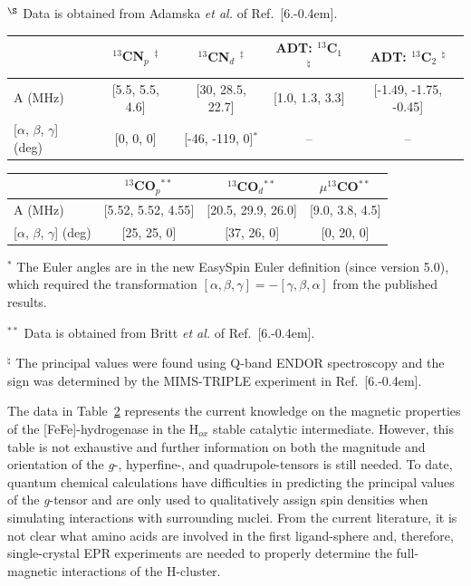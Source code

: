 \begin{table}[hb]
\begin{flushleft}
{$^{\S}$ Data is obtained from Adamska \textit{et al.} of Ref.~[6.\kern-0.4em]. }\end{flushleft}

\begin{tabular}{l|c|c|c|c}
 & $^{13}$CN$_p$ $^\ddagger$ & $^{13}$CN$_d$ $^\ddagger$ & ADT: $^{13}$C$_1$ $^\natural$ & ADT: $^{13}$C$_2$ $^\natural$ \\ \hline \hline
A (MHz) & {[}5.5, 5.5, 4.6{]} & {[}30, 28.5, 22.7{]} & {[}1.0, 1.3, 3.3{]} & {[}-1.49, -1.75, -0.45{]} \\
{[}$\alpha$, $\beta$, $\gamma${]} (deg) & {[}0, 0, 0{]} & {[}-46, -119, 0{]}$^\ast$ & -- & -- \\
\end{tabular}
\newline
\vspace*{0.5em}
\newline
\begin{tabular}{l|c|c|c}
 & $^{13}$CO$_p$$^{\ast\ast}$ & $^{13}$CO$_d$$^{\ast\ast}$ & $\mu^{13}$CO$^{\ast\ast}$ \\ \hline \hline
A (MHz) & {[}5.52, 5.52, 4.55{]} &  {[}20.5, 29.9, 26.0{]} & {[}9.0, 3.8, 4.5{]}\\
{[}$\alpha$, $\beta$, $\gamma${]} (deg) &  {[}25, 25, 0{]} & {[}37, 26, 0{]} & {[}0, 20, 0{]} \\
\end{tabular}\label{table:eprthing}

\begin{flushleft}\footnotesize{
$^\ast$ The Euler angles are in the new EasySpin Euler definition (since version 5.0), which required the transformation $[\alpha,\beta,\gamma]= -[\gamma,\beta,\alpha]$ from the published results.

$^{\ast\ast}$ Data is obtained from Britt \textit{et al.} of Ref.~[6.\kern-0.4em].

$^\natural$ The principal values were found using Q-band ENDOR spectroscopy and the sign was determined by the MIMS-TRIPLE experiment in Ref.~[6.\kern-0.4em].
} \end{flushleft}
\end{table}

The data in Table~\ref{table:eprthing} represents the current knowledge on the magnetic properties of the [FeFe]-hydrogenase in the H$_{ox}$ stable catalytic intermediate. However, this table is not exhaustive and further information on both the magnitude and orientation of the \textit{g}-, hyperfine-, and quadrupole-tensors is still needed. To date, quantum chemical calculations have difficulties in predicting the principal values of the \textit{g}-tensor\cite{GrecoDFT, FiedlerDFT} and are only used to qualitatively assign spin densities when simulating interactions with surrounding nuclei. From the current literature, it is not clear what amino acids are involved in the first ligand-sphere and, therefore, single-crystal EPR experiments are needed to properly determine the full-magnetic interactions of the H-cluster. 

